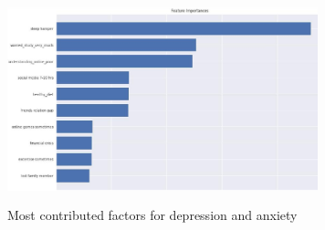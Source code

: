 \begin{figure} [h]
\centering

\includegraphics[width=90mm,height=60mm]{figs/feature_imp.pdf}
\caption{Most contributed factors for depression and anxiety}
\label{fig:feature_imp}
\end{figure}
